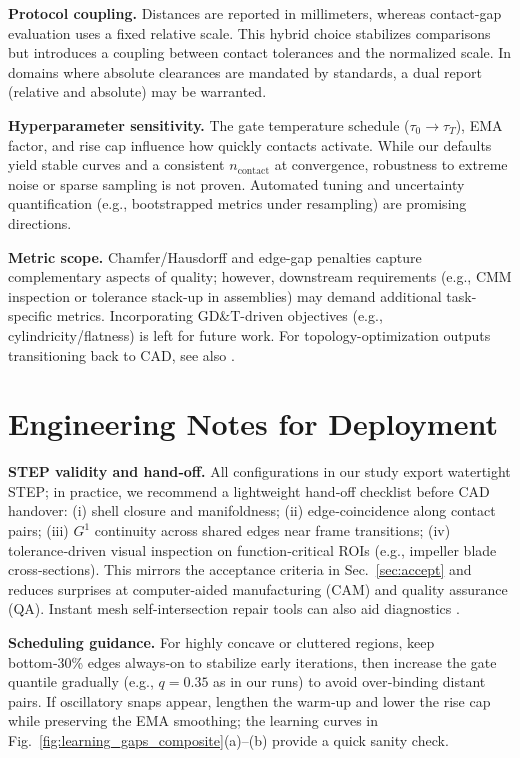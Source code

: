 \documentclass{ieeeaccess}
\begin{document}
\textbf{Protocol coupling.} Distances are reported in millimeters, whereas
contact-gap evaluation uses a fixed relative scale. This hybrid choice
stabilizes comparisons but introduces a coupling between contact
tolerances and the normalized scale. In domains where absolute
clearances are mandated by standards, a dual report (relative and
absolute) may be warranted. 

\textbf{Hyperparameter sensitivity.} The gate temperature schedule
($\tau_0\!\to\!\tau_T$), EMA factor, and rise cap influence how quickly
contacts activate. While our defaults yield stable curves and a consistent
$n_{\text{contact}}$ at convergence, robustness to extreme noise or sparse
sampling is not proven. Automated tuning and uncertainty quantification
(e.g., bootstrapped metrics under resampling) are promising directions. 

\textbf{Metric scope.} Chamfer/Hausdorff and edge-gap penalties capture
complementary aspects of quality; however, downstream requirements
(e.g., CMM inspection or tolerance stack‑up in assemblies) may demand
additional task-specific metrics. Incorporating GD\&T-driven objectives
(e.g., cylindricity/flatness) is left for future work. For topology-optimization outputs transitioning back to CAD, see also \cite{b26}.

\section{Engineering Notes for Deployment}
\label{sec:engnotes}

\textbf{STEP validity and hand‑off.} All configurations in our study export
watertight STEP; in practice, we recommend a lightweight hand‑off
checklist before CAD handover: (i) shell closure and manifoldness; (ii)
edge‑coincidence along contact pairs; (iii) $G^1$ continuity across shared
edges near frame transitions; (iv) tolerance‑driven visual inspection on
function‑critical ROIs (e.g., impeller blade cross‑sections). This mirrors
the acceptance criteria in Sec.~\ref{sec:accept} and reduces surprises at computer-aided manufacturing (CAM) and quality assurance (QA). Instant mesh self-intersection repair tools can also aid diagnostics \cite{b12}.


\textbf{Scheduling guidance.} For highly concave or cluttered regions,
keep bottom‑30\% edges always‑on to stabilize early iterations, then
increase the gate quantile gradually (e.g., $q\!=\!0.35$ as in our runs) to
avoid over‑binding distant pairs. If oscillatory snaps appear, lengthen the
warm‑up and lower the rise cap while preserving the EMA smoothing;
the learning curves in Fig.~\ref{fig:learning_gaps_composite}(a)–(b) provide a quick sanity
check. 
\end{document}
